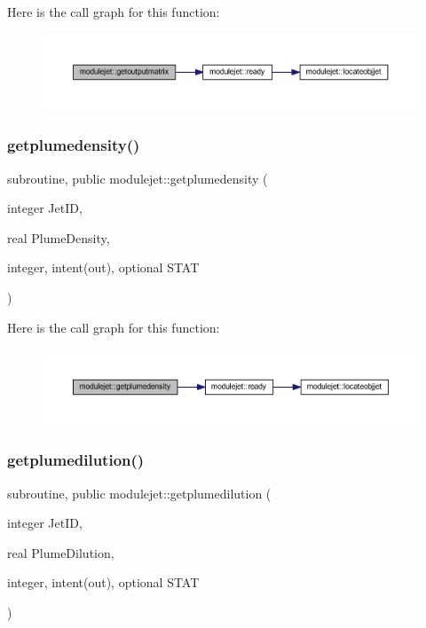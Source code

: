 Here is the call graph for this function\+:\nopagebreak
\begin{figure}[H]
\begin{center}
\leavevmode
\includegraphics[width=350pt]{namespacemodulejet_a81ee4e71d54b53e9b3ab94bb817d66e8_cgraph}
\end{center}
\end{figure}
\mbox{\label{namespacemodulejet_aace5b51fdfea28b29ddf40d44b7805b4}} 
\subsubsection{\texorpdfstring{getplumedensity()}{getplumedensity()}}
{\footnotesize\ttfamily subroutine, public modulejet\+::getplumedensity (\begin{DoxyParamCaption}\item[{integer}]{Jet\+ID,  }\item[{real}]{Plume\+Density,  }\item[{integer, intent(out), optional}]{S\+T\+AT }\end{DoxyParamCaption})}

Here is the call graph for this function\+:\nopagebreak
\begin{figure}[H]
\begin{center}
\leavevmode
\includegraphics[width=350pt]{namespacemodulejet_aace5b51fdfea28b29ddf40d44b7805b4_cgraph}
\end{center}
\end{figure}
\mbox{\label{namespacemodulejet_a5bd04e69691ddf86217eae82701cb7ea}} 
\subsubsection{\texorpdfstring{getplumedilution()}{getplumedilution()}}
{\footnotesize\ttfamily subroutine, public modulejet\+::getplumedilution (\begin{DoxyParamCaption}\item[{integer}]{Jet\+ID,  }\item[{real}]{Plume\+Dilution,  }\item[{integer, intent(out), optional}]{S\+T\+AT }\end{DoxyParamCaption})}

